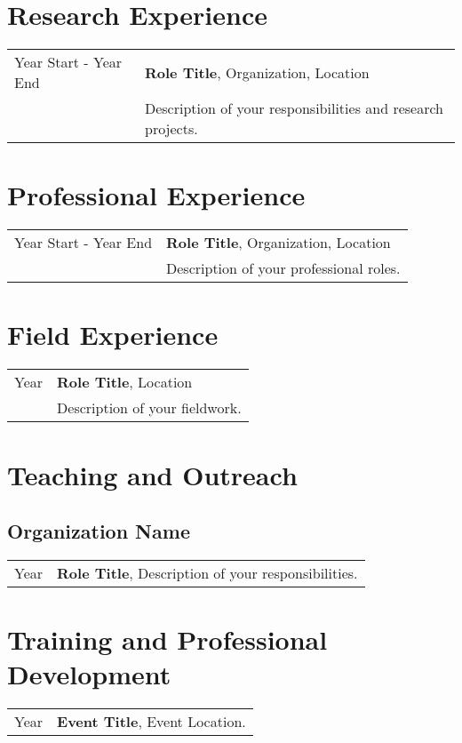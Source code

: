 \section{Research Experience}
    \begin{tabularx}{\textwidth}{>{\raggedright\arraybackslash}p{2.5cm} X}
    Year Start - Year End & \textbf{Role Title}, Organization, Location \\
                          & Description of your responsibilities and research projects.
    \end{tabularx}

\section{Professional Experience}
    \begin{tabularx}{\textwidth}{>{\raggedright\arraybackslash}p{2.5cm} X}
    Year Start - Year End & \textbf{Role Title}, Organization, Location \\
                          & Description of your professional roles.
    \end{tabularx}

\section{Field Experience}
    \begin{tabularx}{\textwidth}{>{\raggedright\arraybackslash}p{1cm} X}
    Year & \textbf{Role Title}, Location \\
         & Description of your fieldwork.
    \end{tabularx}

\section{Teaching and Outreach}
    \subsection*{Organization Name}
    \begin{tabularx}{\textwidth}{>{\raggedright\arraybackslash}p{2.5cm} X}
    Year & \textbf{Role Title}, Description of your responsibilities.
    \end{tabularx}

\section{Training and Professional Development}
    \begin{tabularx}{\textwidth}{>{\raggedright\arraybackslash}p{1cm} X}
    Year & \textbf{Event Title}, Event Location.
    \end{tabularx}

